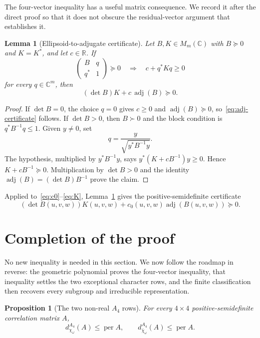 \documentclass[11pt]{article}
\newtheorem{lemma}[theorem]{Lemma}
\newtheorem{proposition}[theorem]{Proposition}
\theoremstyle{definition}
\newcommand{\CC}{\mathbb C}
\newcommand{\RR}{\mathbb R}
\newcommand{\per}{\operatorname{per}}
\newcommand{\adj}{\operatorname{adj}}
\newcommand{\mat}[1]{\begin{pmatrix}#1\end{pmatrix}}
\newcommand{\psd}{\succeq 0}
\newcommand{\pd}{\succ 0}
\begin{document}
The four-vector inequality has a useful matrix consequence.  We record it
after the direct proof so that it does not obscure the residual-vector
argument that establishes it.

\begin{lemma}[Ellipsoid-to-adjugate certificate]\label{lem:ellipsoid}
Let $B,K\in M_m(\CC)$ with $B\psd$ and $K=K^*$, and let $c\in\RR$.  If
\[
 \mat{B&q\\q^*&1}\psd\quad\Longrightarrow\quad c+q^*Kq\geq0
\]
for every $q\in\CC^m$, then
\begin{equation}\label{eq:adj-certificate}
 (\det B)K+c\,\adj(B)\psd.
\end{equation}
\end{lemma}

\begin{proof}
If $\det B=0$, the choice $q=0$ gives $c\geq0$ and
$\adj(B)\psd$, so~\eqref{eq:adj-certificate} follows.  If $\det B>0$, then
$B\pd$ and the block condition is $q^*B^{-1}q\leq1$.  Given $y\neq0$, set
\[
 q=\frac{y}{\sqrt{y^*B^{-1}y}}.
\]
The hypothesis, multiplied by $y^*B^{-1}y$, says
$y^*(K+cB^{-1})y\geq0$.  Hence $K+cB^{-1}\psd$.  Multiplication by
$\det B>0$ and the identity $\adj(B)=(\det B)B^{-1}$ prove the claim.
\end{proof}

Applied to~\eqref{eq:c0}--\eqref{eq:K}, Lemma~\ref{lem:ellipsoid} gives the
positive-semidefinite certificate
\begin{equation}\label{eq:a4-certificate}
 (\det B(u,v,w))K(u,v,w)+c_0(u,v,w)\adj(B(u,v,w))\psd.
\end{equation}

\section{Completion of the proof}\label{sec:completion}

No new inequality is needed in this section.  We now follow the roadmap in
reverse: the geometric polynomial proves the four-vector inequality, that
inequality settles the two exceptional character rows, and the finite
classification then recovers every subgroup and irreducible representation.

\begin{proposition}[The two non-real $A_4$ rows]\label{prop:a4-rows}
For every $4\times4$ positive-semidefinite correlation matrix $A$,
\[
 d_{\chi_\omega}^{A_4}(A)\leq\per A,\qquad
 d_{\bar\chi_\omega}^{A_4}(A)\leq\per A.
\]
\end{proposition}
\end{document}

